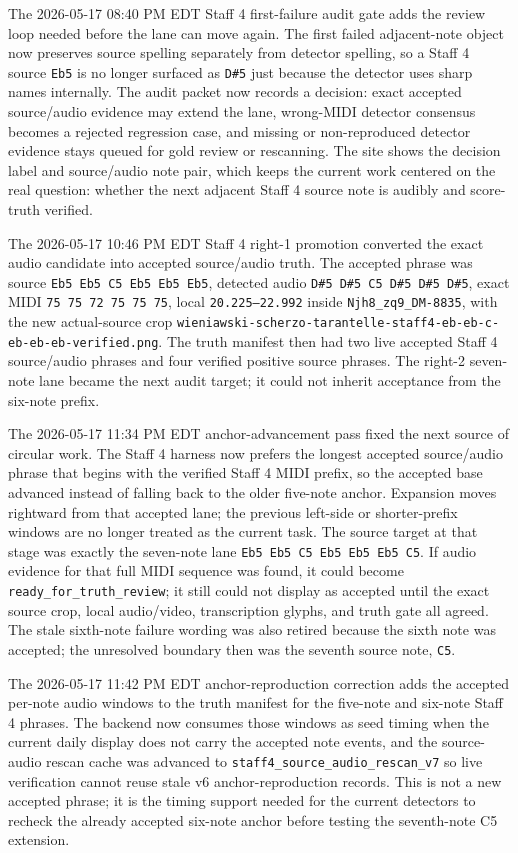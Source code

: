 The 2026-05-17 08:40 PM EDT Staff 4 first-failure audit gate adds the review loop needed before the lane can move again. The first failed adjacent-note object now preserves source spelling separately from detector spelling, so a Staff 4 source \texttt{Eb5} is no longer surfaced as \texttt{D\#5} just because the detector uses sharp names internally. The audit packet now records a decision: exact accepted source/audio evidence may extend the lane, wrong-MIDI detector consensus becomes a rejected regression case, and missing or non-reproduced detector evidence stays queued for gold review or rescanning. The site shows the decision label and source/audio note pair, which keeps the current work centered on the real question: whether the next adjacent Staff 4 source note is audibly and score-truth verified.

The 2026-05-17 10:46 PM EDT Staff 4 right-1 promotion converted the exact audio candidate into accepted source/audio truth. The accepted phrase was source \texttt{Eb5 Eb5 C5 Eb5 Eb5 Eb5}, detected audio \texttt{D\#5 D\#5 C5 D\#5 D\#5 D\#5}, exact MIDI \texttt{75 75 72 75 75 75}, local \texttt{20.225--22.992} inside \texttt{Njh8\_zq9\_DM-8835}, with the new actual-source crop \texttt{wieniawski-scherzo-tarantelle-staff4-eb-eb-c-eb-eb-eb-verified.png}. The truth manifest then had two live accepted Staff 4 source/audio phrases and four verified positive source phrases. The right-2 seven-note lane became the next audit target; it could not inherit acceptance from the six-note prefix.

The 2026-05-17 11:34 PM EDT anchor-advancement pass fixed the next source of circular work. The Staff 4 harness now prefers the longest accepted source/audio phrase that begins with the verified Staff 4 MIDI prefix, so the accepted base advanced instead of falling back to the older five-note anchor. Expansion moves rightward from that accepted lane; the previous left-side or shorter-prefix windows are no longer treated as the current task. The source target at that stage was exactly the seven-note lane \texttt{Eb5 Eb5 C5 Eb5 Eb5 Eb5 C5}. If audio evidence for that full MIDI sequence was found, it could become \texttt{ready\_for\_truth\_review}; it still could not display as accepted until the exact source crop, local audio/video, transcription glyphs, and truth gate all agreed. The stale sixth-note failure wording was also retired because the sixth note was accepted; the unresolved boundary then was the seventh source note, \texttt{C5}.

The 2026-05-17 11:42 PM EDT anchor-reproduction correction adds the accepted per-note audio windows to the truth manifest for the five-note and six-note Staff 4 phrases. The backend now consumes those windows as seed timing when the current daily display does not carry the accepted note events, and the source-audio rescan cache was advanced to \texttt{staff4\_source\_audio\_rescan\_v7} so live verification cannot reuse stale v6 anchor-reproduction records. This is not a new accepted phrase; it is the timing support needed for the current detectors to recheck the already accepted six-note anchor before testing the seventh-note C5 extension.

